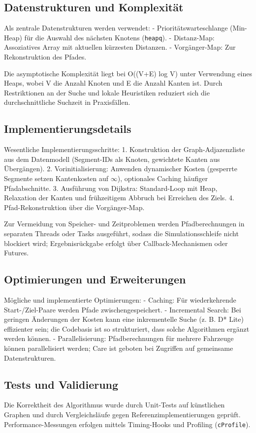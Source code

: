 \subsection*{Datenstrukturen und Komplexität}
Als zentrale Datenstrukturen werden verwendet:
- Prioritätswarteschlange (Min-Heap) für die Auswahl des nächsten Knotens (\texttt{heapq}).
- Distanz-Map: Assoziatives Array mit aktuellen kürzesten Distanzen.
- Vorgänger-Map: Zur Rekonstruktion des Pfades.

Die asymptotische Komplexität liegt bei O((V+E) log V) unter Verwendung eines Heaps, wobei V die Anzahl Knoten und E die Anzahl Kanten ist. Durch Restriktionen an der Suche und lokale Heuristiken reduziert sich die durchschnittliche Suchzeit in Praxisfällen.

\subsection*{Implementierungsdetails}
Wesentliche Implementierungsschritte:
1. Konstruktion der Graph-Adjazenzliste aus dem Datenmodell (Segment-IDs als Knoten, gewichtete Kanten aus Übergängen).
2. Vorinitialisierung: Anwenden dynamischer Kosten (gesperrte Segmente setzen Kantenkosten auf \(\infty\)), optionales Caching häufiger Pfadabschnitte.
3. Ausführung von Dijkstra: Standard-Loop mit Heap, Relaxation der Kanten und frühzeitigem Abbruch bei Erreichen des Ziels.
4. Pfad-Rekonstruktion über die Vorgänger-Map.

Zur Vermeidung von Speicher- und Zeitproblemen werden Pfadberechnungen in separaten Threads oder Tasks ausgeführt, sodass die Simulationsschleife nicht blockiert wird; Ergebnisrückgabe erfolgt über Callback-Mechanismen oder Futures.

\subsection*{Optimierungen und Erweiterungen}
Mögliche und implementierte Optimierungen:
- Caching: Für wiederkehrende Start-/Ziel-Paare werden Pfade zwischengespeichert.
- Incremental Search: Bei geringen Änderungen der Kosten kann eine inkrementelle Suche (z. B. D* Lite) effizienter sein; die Codebasis ist so strukturiert, dass solche Algorithmen ergänzt werden können.
- Parallelisierung: Pfadberechnungen für mehrere Fahrzeuge können parallelisiert werden; Care ist geboten bei Zugriffen auf gemeinsame Datenstrukturen.

\subsection*{Tests und Validierung}
Die Korrektheit des Algorithmus wurde durch Unit-Tests auf künstlichen Graphen und durch Vergleichsläufe gegen Referenzimplementierungen geprüft. Performance-Messungen erfolgen mittels Timing-Hooks und Profiling (\texttt{cProfile}).

